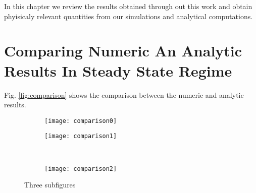 In this chapter we review the results obtained through out this work and obtain phyisicaly relevant quantities from our simulations and analytical computations.

\section{Comparing Numeric An Analytic Results In Steady State Regime}

Fig. \ref{fig:comparison} shows the comparison between the numeric and analytic results. 



\begin{figure}[htbp]
\begin{subfigure}{.5\linewidth}
\centering
\texttt{[image: comparison0]}
\caption{}
\label{fig:sub1}
\end{subfigure}%
\begin{subfigure}{.5\linewidth}
\centering
\texttt{[image: comparison1]}
\caption{}
\label{fig:sub2}
\end{subfigure}\\[1ex]
\begin{subfigure}{\linewidth}
\centering
\texttt{[image: comparison2]}
\caption{}
\label{fig:sub3}
\end{subfigure}
\caption{Three subfigures}
\label{fig:test}
\end{figure}


\newpage


